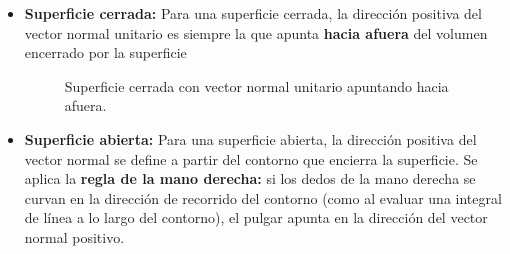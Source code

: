 \documentclass{article}
\begin{document}
\begin{itemize}
    \item \textbf{Superficie cerrada:} Para una superficie cerrada, la dirección positiva del vector normal unitario es siempre la que apunta \textbf{hacia afuera} del volumen encerrado por la superficie 
    \begin{figure}[h]
    \centering
    \caption{Superficie cerrada con vector normal unitario apuntando hacia afuera.}
    \label{fig:sup_cerrada}
\end{figure}
   
    \item \textbf{Superficie abierta:} Para una superficie abierta, la dirección positiva del vector normal se define a partir del contorno que encierra la superficie. Se aplica la \textbf{regla de la mano derecha:} si los dedos de la mano derecha se curvan en la dirección de recorrido del contorno (como al evaluar una integral de línea a lo largo del contorno), el pulgar apunta en la dirección del vector normal positivo.
    \begin{figure}[h]
    \centering
\end{figure}
\end{itemize}
\end{document}
